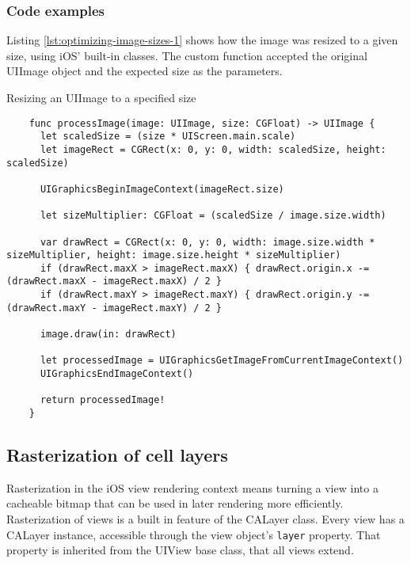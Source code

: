 \documentclass[a4paper,12pt]{article}
\begin{document}
\subsubsection{Code examples}
Listing \ref{lst:optimizing-image-sizes-1} shows how the image was resized to a given size, using iOS' built-in classes. The custom function accepted the original UIImage object and the expected size as the parameters.
\begin{listing}[H]
  \caption{Resizing an UIImage to a specified size}
  \label{lst:optimizing-image-sizes-1}
  \begin{verbatim}
    func processImage(image: UIImage, size: CGFloat) -> UIImage {
      let scaledSize = (size * UIScreen.main.scale)
      let imageRect = CGRect(x: 0, y: 0, width: scaledSize, height: scaledSize)

      UIGraphicsBeginImageContext(imageRect.size)

      let sizeMultiplier: CGFloat = (scaledSize / image.size.width)

      var drawRect = CGRect(x: 0, y: 0, width: image.size.width * sizeMultiplier, height: image.size.height * sizeMultiplier)
      if (drawRect.maxX > imageRect.maxX) { drawRect.origin.x -= (drawRect.maxX - imageRect.maxX) / 2 }
      if (drawRect.maxY > imageRect.maxY) { drawRect.origin.y -= (drawRect.maxY - imageRect.maxY) / 2 }

      image.draw(in: drawRect)

      let processedImage = UIGraphicsGetImageFromCurrentImageContext()
      UIGraphicsEndImageContext()

      return processedImage!
    }
  \end{verbatim}
\end{listing}


\subsection{Rasterization of cell layers}
\label{subsec:rasterization-of-cell-layers}
Rasterization in the iOS view rendering context means turning a view into a cacheable bitmap that can be used in later rendering more efficiently. Rasterization of views is a built in feature of the CALayer class. Every view has a CALayer instance, accessible through the view object's \texttt{layer} property. That property is inherited from the UIView base class, that all views extend.
\end{document}
